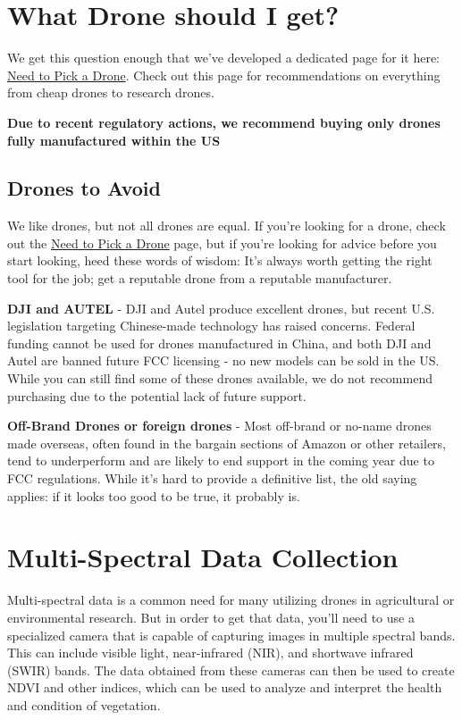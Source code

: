 \documentclass[
  12pt,
]{book}
\begin{document}
\section{What Drone should I get?}\label{what-drone-should-i-get}

We get this question enough that we've developed a dedicated page for it here: \href{https://ucdrones.github.io/pickdrone.html}{Need to Pick a Drone}. Check out this page for recommendations on everything from cheap drones to research drones.

\textbf{Due to recent regulatory actions, we recommend buying only drones fully manufactured within the US}

\subsection{Drones to Avoid}\label{drones-to-avoid}

We like drones, but not all drones are equal. If you're looking for a drone, check out the \href{https://ucdrones.github.io/pickdrone.html}{Need to Pick a Drone} page, but if you're looking for advice before you start looking, heed these words of wisdom: It's always worth getting the right tool for the job; get a reputable drone from a reputable manufacturer.

\textbf{DJI and AUTEL} - DJI and Autel produce excellent drones, but recent U.S. legislation targeting Chinese-made technology has raised concerns. Federal funding cannot be used for drones manufactured in China, and both DJI and Autel are banned future FCC licensing - no new models can be sold in the US. While you can still find some of these drones available, we do not recommend purchasing due to the potential lack of future support.

\textbf{Off-Brand Drones or foreign drones} - Most off-brand or no-name drones made overseas, often found in the bargain sections of Amazon or other retailers, tend to underperform and are likely to end support in the coming year due to FCC regulations. While it's hard to provide a definitive list, the old saying applies: if it looks too good to be true, it probably is.

\section{Multi-Spectral Data Collection}\label{multi-spectral-data-collection}

Multi-spectral data is a common need for many utilizing drones in agricultural or environmental research. But in order to get that data, you'll need to use a specialized camera that is capable of capturing images in multiple spectral bands. This can include visible light, near-infrared (NIR), and shortwave infrared (SWIR) bands. The data obtained from these cameras can then be used to create NDVI and other indices, which can be used to analyze and interpret the health and condition of vegetation.
\end{document}
